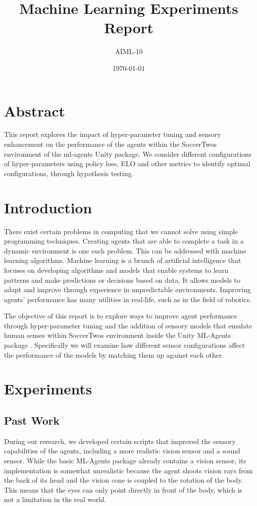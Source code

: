 \documentclass[a4paper,12pt]{article}
\title{Machine Learning Experiments Report}
\author{AIML-10}
\date{\today}
\begin{document}
\maketitle
\tableofcontents
\newpage

\section*{Abstract}
This report explores the impact of hyper-parameter tuning and sensory enhancement on the performance of the agents within the SoccerTwos environment of the ml-agents Unity package. We consider different configurations of hyper-parameters using policy loss, ELO and other metrics to identify optimal configurations, through hypothesis testing.


\section{Introduction}
There exist certain problems in computing that we cannot solve using simple programming techniques. Creating agents that are able to complete a task in a dynamic environment is one such problem. This can be addressed with machine learning algorithms. Machine learning is a branch of artificial intelligence that focuses on developing algorithms and models that enable systems to learn patterns and make predictions or decisions based on data. It allows models to adapt and improve through experience in unpredictable environments. Improving agents' performance has many utilities in real-life, such as in the field of robotics. 

The objective of this report is to explore ways to improve agent performance through hyper-parameter tuning and the addition of sensory models \cite{benoit2002fuzzy} that emulate human senses within SoccerTwos environment inside the Unity ML-Agents package \cite{unityTechnologies2019mlagents} \cite{ilosvay2024unity} \cite{juliani2018unity}.  Specifically we will examine how different sensor configurations affect the performance of the models by matching them up against each other. 

\section{Experiments}

\subsection{Past Work}
During our research, we developed certain scripts that improved the sensory capabilities of the agents, including a more realistic vision sensor and a sound sensor. While the basic ML-Agents package already contains a vision sensor, its implementation is somewhat unrealistic because the agent shoots vision rays from the back of its head and the vision cone is coupled to the rotation of the body. This means that the eyes can only point directly in front of the body, which is not a limitation in the real world. 
\end{document}
